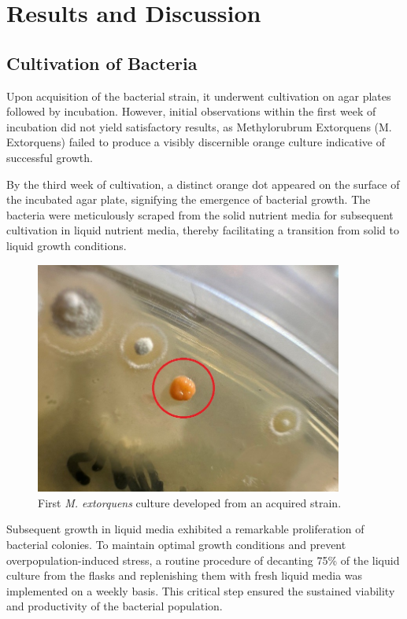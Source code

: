 \chapter{Results and Discussion}

\section{Cultivation of Bacteria\authorB}
Upon acquisition of the bacterial strain, it underwent cultivation on agar plates followed by
incubation. However, initial observations within the first week of incubation did not yield
satisfactory results, as Methylorubrum Extorquens (M. Extorquens) failed to produce a visibly
discernible orange culture indicative of successful growth.

By the third week of cultivation, a distinct orange dot appeared on the surface of the incubated
agar plate, signifying the emergence of bacterial growth. The bacteria were meticulously scraped
from the solid nutrient media for subsequent cultivation in liquid nutrient media, thereby
facilitating a transition from solid to liquid growth conditions.

\begin{figure}[H]
    \centering
    \includegraphics[width=0.9\textwidth]{./media/images/first_mextorquens}
    \caption{First \emph{M. extorquens} culture developed from an acquired strain.}
    \label{fig:first_mextorquens}
\end{figure}

Subsequent growth in liquid media exhibited a remarkable proliferation of bacterial colonies. To
maintain optimal growth conditions and prevent overpopulation-induced stress, a routine
procedure of decanting 75\% of the liquid culture from the flasks and replenishing them with fresh
liquid media was implemented on a weekly basis. This critical step ensured the sustained viability
and productivity of the bacterial population.

